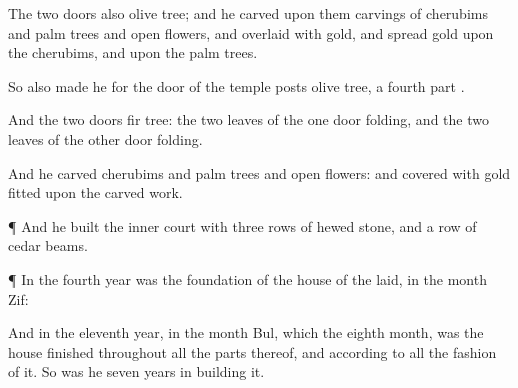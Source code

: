 {The
two
doors also
{}
olive
tree; and he
carved upon them
carvings of
cherubims and palm
trees and
open
flowers, and
overlaid
{} with
gold, and
spread
gold upon the
cherubims, and upon the palm
trees.

So also
made he for the
door of the
temple
posts
{}
olive
tree, a fourth
part
{}.

And the
two
doors
{}
fir
tree: the
two
leaves of the
one
door
{}
folding, and the
two
leaves of the
other
door
{}
folding.

And he
carved
{}
cherubims and palm
trees and
open
flowers: and
covered
{} with
gold
fitted upon the carved
work.


\par }{\PP {}¶ And he
built the
inner
court with
three
rows of hewed
stone, and a
row of
cedar
beams.


\par }{\PP {}¶ In the
fourth
year was the
foundation of the
house of the
{}
laid, in the
month
Zif:

And in the
eleventh
year, in the
month
Bul, which
{} the
eighth
month, was the
house
finished throughout all the
parts thereof, and according to all the
fashion of it. So was he
seven
years in
building it.




\par }
